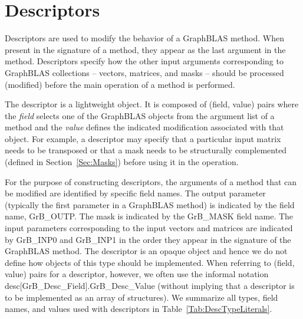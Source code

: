\section{Descriptors}
\label{Sec:Descriptors}

Descriptors are used to modify the behavior of a GraphBLAS method.
When present in the signature of a method, they appear as the last argument in the method.
Descriptors specify how the other input arguments
corresponding to GraphBLAS collections -- vectors, matrices, and masks -- should
be processed (modified) before the main operation of a method is performed.

The descriptor is a lightweight object.  It is composed
of (field, value) pairs where the \emph{field} selects one of the GraphBLAS objects
from the argument list of a method and the \emph{value} defines the indicated modification
associated with that object.  For example, a descriptor may specify that a particular 
input matrix needs to be transposed or that a mask needs to be structurally 
complemented (defined in Section~\ref{Sec:Masks}) before using it in the operation.

For the purpose of constructing descriptors, the arguments of a method
that can be modified are identified by specific field names. The output parameter (typically
the first parameter in a GraphBLAS method) is indicated by the field name, 
{\sf GrB\_OUTP}.  The mask is indicated by the {\sf GrB\_MASK} field name. The input parameters
corresponding to the input vectors and matrices are indicated by {\sf GrB\_INP0} and
{\sf GrB\_INP1} in the order they appear in the signature of the GraphBLAS method. 
The descriptor is an opaque object and hence we do not define how objects of this type should
be implemented.   When referring to (field, value) pairs for a descriptor, however, we often use the informal
notation {\sf desc[GrB\_Desc\_Field].GrB\_Desc\_Value} (without implying that a descriptor is to be implemented as an
array of structures).    We summarize all types, field names, and values used 
with descriptors in Table~\ref{Tab:DescTypeLiterals}. 



